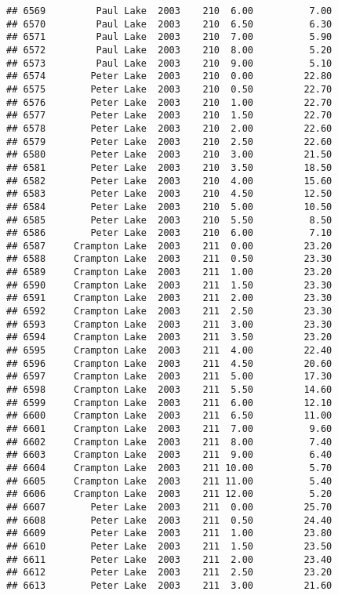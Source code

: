 \documentclass[
]{article}
\begin{document}
\begin{verbatim}
## 6569         Paul Lake  2003    210  6.00          7.00
## 6570         Paul Lake  2003    210  6.50          6.30
## 6571         Paul Lake  2003    210  7.00          5.90
## 6572         Paul Lake  2003    210  8.00          5.20
## 6573         Paul Lake  2003    210  9.00          5.10
## 6574        Peter Lake  2003    210  0.00         22.80
## 6575        Peter Lake  2003    210  0.50         22.70
## 6576        Peter Lake  2003    210  1.00         22.70
## 6577        Peter Lake  2003    210  1.50         22.70
## 6578        Peter Lake  2003    210  2.00         22.60
## 6579        Peter Lake  2003    210  2.50         22.60
## 6580        Peter Lake  2003    210  3.00         21.50
## 6581        Peter Lake  2003    210  3.50         18.50
## 6582        Peter Lake  2003    210  4.00         15.60
## 6583        Peter Lake  2003    210  4.50         12.50
## 6584        Peter Lake  2003    210  5.00         10.50
## 6585        Peter Lake  2003    210  5.50          8.50
## 6586        Peter Lake  2003    210  6.00          7.10
## 6587     Crampton Lake  2003    211  0.00         23.20
## 6588     Crampton Lake  2003    211  0.50         23.30
## 6589     Crampton Lake  2003    211  1.00         23.20
## 6590     Crampton Lake  2003    211  1.50         23.30
## 6591     Crampton Lake  2003    211  2.00         23.30
## 6592     Crampton Lake  2003    211  2.50         23.30
## 6593     Crampton Lake  2003    211  3.00         23.30
## 6594     Crampton Lake  2003    211  3.50         23.20
## 6595     Crampton Lake  2003    211  4.00         22.40
## 6596     Crampton Lake  2003    211  4.50         20.60
## 6597     Crampton Lake  2003    211  5.00         17.30
## 6598     Crampton Lake  2003    211  5.50         14.60
## 6599     Crampton Lake  2003    211  6.00         12.10
## 6600     Crampton Lake  2003    211  6.50         11.00
## 6601     Crampton Lake  2003    211  7.00          9.60
## 6602     Crampton Lake  2003    211  8.00          7.40
## 6603     Crampton Lake  2003    211  9.00          6.40
## 6604     Crampton Lake  2003    211 10.00          5.70
## 6605     Crampton Lake  2003    211 11.00          5.40
## 6606     Crampton Lake  2003    211 12.00          5.20
## 6607        Peter Lake  2003    211  0.00         25.70
## 6608        Peter Lake  2003    211  0.50         24.40
## 6609        Peter Lake  2003    211  1.00         23.80
## 6610        Peter Lake  2003    211  1.50         23.50
## 6611        Peter Lake  2003    211  2.00         23.40
## 6612        Peter Lake  2003    211  2.50         23.20
## 6613        Peter Lake  2003    211  3.00         21.60

\end{verbatim}
\end{document}
